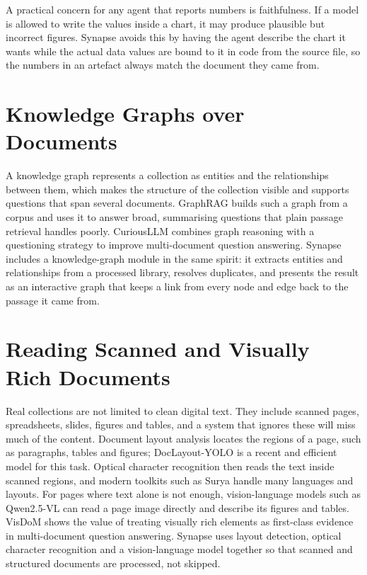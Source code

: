 A practical concern for any agent that reports numbers is faithfulness. If a
model is allowed to write the values inside a chart, it may produce plausible but
incorrect figures. Synapse avoids this by having the agent describe the chart it
wants while the actual data values are bound to it in code from the source file,
so the numbers in an artefact always match the document they came from.

\section{Knowledge Graphs over Documents}

A knowledge graph represents a collection as entities and the relationships
between them, which makes the structure of the collection visible and supports
questions that span several documents. GraphRAG \cite{edge2024graphrag} builds
such a graph from a corpus and uses it to answer broad, summarising questions
that plain passage retrieval handles poorly. CuriousLLM \cite{yang2024curiousllm}
combines graph reasoning with a questioning strategy to improve multi-document
question answering. Synapse includes a knowledge-graph module in the same spirit:
it extracts entities and relationships from a processed library, resolves
duplicates, and presents the result as an interactive graph that keeps a link
from every node and edge back to the passage it came from.

\section{Reading Scanned and Visually Rich Documents}

Real collections are not limited to clean digital text. They include scanned
pages, spreadsheets, slides, figures and tables, and a system that ignores these
will miss much of the content. Document layout analysis locates the regions of a
page, such as paragraphs, tables and figures; DocLayout-YOLO \cite{zhao2024doclayout}
is a recent and efficient model for this task. Optical character recognition then
reads the text inside scanned regions, and modern toolkits such as Surya
\cite{surya2024} handle many languages and layouts. For pages where text alone is
not enough, vision-language models such as Qwen2.5-VL \cite{bai2025qwen25vl} can
read a page image directly and describe its figures and tables. VisDoM
\cite{suri2024visdom} shows the value of treating visually rich elements as
first-class evidence in multi-document question answering. Synapse uses layout
detection, optical character recognition and a vision-language model together so
that scanned and structured documents are processed, not skipped.

